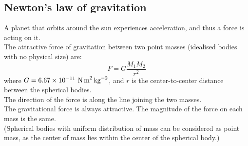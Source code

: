 \subsection{Newton's law of gravitation}
A planet that orbits around the sun experiences acceleration, and thus a force is acting on it.\\
The attractive force of gravitation between two point masses (idealised bodies with no physical size) are:
\[F=G\dfrac{M_1M_2}{r^2}\]
where $G=6.67\times 10^{-11}\ \text{N\,m}^{2}\,\text{kg}^{-2}$, and $r$ is the center-to-center distance between the spherical bodies.\\
The direction of the force is along the line joining the two masses.\\
The gravitational force is always attractive. The magnitude of the force on each mass is the same.\\
(Spherical bodies with uniform distribution of mass can be considered as point mass, as the center of mass lies within the center of the spherical body.)
